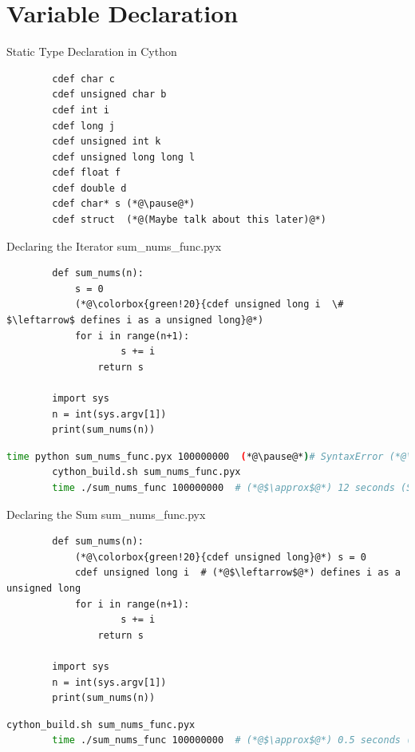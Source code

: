 \documentclass[11pt]{beamer}
\begin{document}
\section{Variable Declaration}
\begin{frame}[fragile]{Static Type Declaration in Cython}
	\begin{lstlisting}
		cdef char c
		cdef unsigned char b
		cdef int i
		cdef long j
		cdef unsigned int k
		cdef unsigned long long l
		cdef float f
		cdef double d
		cdef char* s (*@\pause@*)
		cdef struct  (*@(Maybe talk about this later)@*)
	\end{lstlisting}
\end{frame}

\begin{frame}[fragile]{Declaring the Iterator}
	sum\_nums\_func.pyx
	\begin{lstlisting}
		def sum_nums(n):
		    s = 0
		    (*@\colorbox{green!20}{cdef unsigned long i  \# $\leftarrow$ defines i as a unsigned long}@*)
		    for i in range(n+1):
		    	    s += i
		    	return s
		
		import sys
		n = int(sys.argv[1])
		print(sum_nums(n))
	\end{lstlisting}
	\pause
	\begin{lstlisting}[language=Bash]
		time python sum_nums_func.pyx 100000000  (*@\pause@*)# SyntaxError (*@\pause@*)
		cython_build.sh sum_nums_func.pyx
		time ./sum_nums_func 100000000  # (*@$\approx$@*) 12 seconds (Slightly faster than without the cdef)
	\end{lstlisting}
\end{frame}

\begin{frame}[fragile]{Declaring the Sum}
	sum\_nums\_func.pyx
	\begin{lstlisting}
		def sum_nums(n):
		    (*@\colorbox{green!20}{cdef unsigned long}@*) s = 0
		    cdef unsigned long i  # (*@$\leftarrow$@*) defines i as a unsigned long
		    for i in range(n+1):
		    	    s += i
		    	return s
		
		import sys
		n = int(sys.argv[1])
		print(sum_nums(n))
	\end{lstlisting}
	\pause
	\begin{lstlisting}[language=Bash]
		cython_build.sh sum_nums_func.pyx
		time ./sum_nums_func 100000000  # (*@$\approx$@*) 0.5 seconds (Slightly fasterer than without the cdef)
	\end{lstlisting}
\end{frame}
\end{document}
